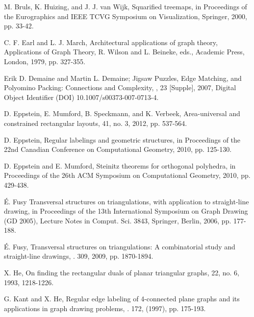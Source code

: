 \documentclass[11pt]{article}
\begin{document}

\begin{thebibliography}{5}

M. Bruls, K. Huizing, and J. J. van Wijk, \newblock Squarified treemaps,
in Proceedings of the Eurographics
and IEEE TCVG Symposium on Visualization,
Springer, 2000, pp. 33-42.

C. F. Earl and L. J. March,
\newblock Architectural applications of graph theory,
\newblock Applications of Graph Theory,
R. Wilson and L. Beineke, eds., Academic Press, London, 1979, pp. 327-355.

Erik D. Demaine and Martin L. Demaine;
\newblock Jigsaw Puzzles, Edge Matching, and Polyomino Packing: Connections and Complexity,
,
23 [Supple], 2007, Digital Object Identifier
(DOI) 10.1007/s00373-007-0713-4.

D. Eppstein, E. Mumford, B. Speckmann, and K. Verbeek,
\newblock Area-universal and constrained rectangular layouts,
 41, no. 3, 2012, pp. 537-564.

D. Eppstein,
\newblock Regular labelings and geometric structures,
in Proceedings of the 22nd Canadian
Conference on Computational Geometry, 2010, pp. 125-130.

D. Eppstein and E. Mumford,
\newblock Steinitz theorems for orthogonal polyhedra,
in Proceedings of the 26th ACM Symposium on Computational
Geometry, 2010, pp. 429-438.

\'{E}. Fusy
\newblock Transversal structures on triangulations, with application to
straight-line drawing,
in Proceedings of the 13th International Symposium on Graph Drawing (GD 2005),
Lecture Notes in Comput. Sci. 3843, Springer, Berlin, 2006, pp. 177-188.

\'{E}. Fusy,
\newblock Transversal structures on triangulations: A combinatorial study
and straight-line drawings,
. 309, 2009, pp. 1870-1894.

X. He,
\newblock On finding the rectangular duals of planar triangular graphs,
 22, no. 6, 1993, 1218-1226.

G. Kant and X. He,
\newblock Regular edge labeling of 4-connected plane graphs and its applications in
graph drawing problems,
. 172, (1997), pp. 175-193.




\end{thebibliography}
\end{document}
